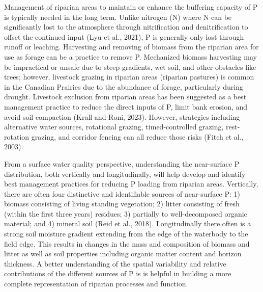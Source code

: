 \documentclass[
]{agujournal2019}
\begin{document}
Management of riparian areas to maintain or enhance the buffering
capacity of P is typically needed in the long term. Unlike nitrogen (N)
where N can be significantly lost to the atmosphere through
nitrification and denitrification to offset the continued input (Lyu et
al., 2021), P is generally only lost through runoff or leaching.
Harvesting and removing of biomass from the riparian area for use as
forage can be a practice to remove P. Mechanized biomass harvesting may
be impractical or unsafe due to steep gradients, wet soil, and other
obstacles like trees; however, livestock grazing in riparian areas
(riparian pastures) is common in the Canadian Prairies due to the
abundance of forage, particularly during drought. Livestock exclusion
from riparian areas has been suggested as a best management practice to
reduce the direct inputs of P, limit bank erosion, and avoid soil
compaction (Krall and Roni, 2023). However, strategies including
alternative water sources, rotational grazing, timed-controlled grazing,
rest-rotation grazing, and corridor fencing can all reduce those risks
(Fitch et al., 2003).

From a surface water quality perspective, understanding the near-surface
P distribution, both vertically and longitudinally, will help develop
and identify best management practices for reducing P loading from
riparian areas. Vertically, there are often four distinctive and
identifiable sources of near-surface P: 1) biomass consisting of living
standing vegetation; 2) litter consisting of fresh (within the first
three years) residues; 3) partially to well-decomposed organic material;
and 4) mineral soil (Reid et al., 2018). Longitudinally there often is a
strong soil moisture gradient extending from the edge of the waterbody
to the field edge. This results in changes in the mass and composition
of biomass and litter as well as soil properties including organic
matter content and horizon thickness. A better understanding of the
spatial variability and relative contributions of the different sources
of P is is helpful in building a more complete representation of
riparian processes and function.
\end{document}
